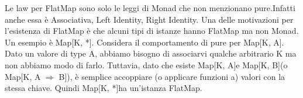 \noindent Le law per FlatMap sono solo le leggi di Monad che non menzionano pure.Infatti anche essa è Associativa, Left Identity, Right Identity. Una delle motivazioni per l'esistenza di FlatMap è che alcuni tipi di istanze hanno FlatMap ma non Monad. Un esempio è Map[K, *]. Considera il comportamento di pure per Map[K, A]. Dato un valore di type A, abbiamo bisogno di associarvi qualche arbitrario K ma non abbiamo modo di farlo. Tuttavia, dato che esiste Map[K, A]e Map[K, B](o Map[K, A $\Rightarrow$ B]), è semplice accoppiare (o applicare funzioni a) valori con la stessa chiave. Quindi Map[K, *]ha un'istanza FlatMap.